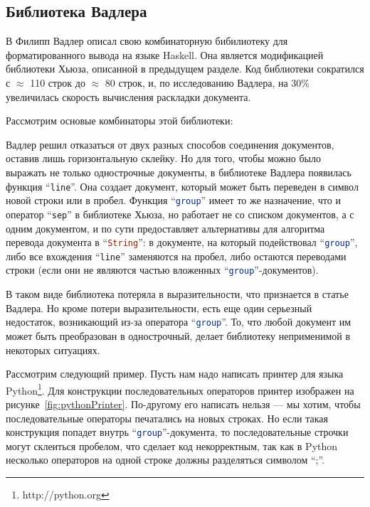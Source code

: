 \newpage

\subsection{Библиотека Вадлера}

В \cite{wadler} Филипп Вадлер описал свою комбинаторную бибилиотеку для форматированного вывода на языке Haskell. Она является модификацией библиотеки Хьюза, описанной в предыдущем разделе. Код библиотеки сократился с $\approx$ 110 строк до $\approx$ 80 строк, и, по исследованию Вадлера, на 30\% увеличилась скорость вычисления раскладки документа.

Рассмотрим основые комбинаторы этой библиотеки:


Вадлер решил отказаться от двух разных способов соединения документов, оставив лишь горизонтальную склейку. Но для того, чтобы можно было выражать не только однострочные документы, в библиотеке Вадлера появилась функция “\lstinline[language=Haskell]{line}”. Она создает документ, который может быть переведен в символ новой строки или в пробел.
Функция “\lstinline[language=Haskell]{group}” имеет то же назначение, что и оператор “\lstinline[language=Haskell]{sep}” в библиотеке Хьюза, но работает не со списком документов, а с одним документом, и по сути предоставляет альтернативы для алгоритма перевода документа в “\lstinline[language=Haskell]{String}”: в документе, на который подействовал “\lstinline[language=Haskell]{group}”, либо все вхождения “\lstinline[language=Haskell]{line}” заменяются на пробел, либо остаются переводами строки (если они не являются частью вложенных “\lstinline[language=Haskell]{group}”-документов).

В таком виде библиотека потеряла в выразительности, что признается в статье Вадлера. Но кроме потери выразительности, есть еще один серьезный недостаток, возникающий из-за оператора “\lstinline[language=Haskell]{group}”. То, что любой документ им может быть преобразован в однострочный, делает библиотеку неприменимой в некоторых ситуациях. 

Рассмотрим следующий пример. Пусть нам надо написать принтер для языка Python\footnote{http://python.org}. Для конструкции последовательных операторов принтер изображен на рисунке~\ref{fig:pythonPrinter}.
По-другому его написать нельзя --- мы хотим, чтобы последовательные операторы печатались на новых строках. Но если такая конструкция попадет внутрь “\lstinline[language=Haskell]{group}”-документа, то последовательные строчки могут склеиться пробелом, что сделает код некорректным, так как в Python несколько операторов на одной строке должны разделяться символом “;”.

